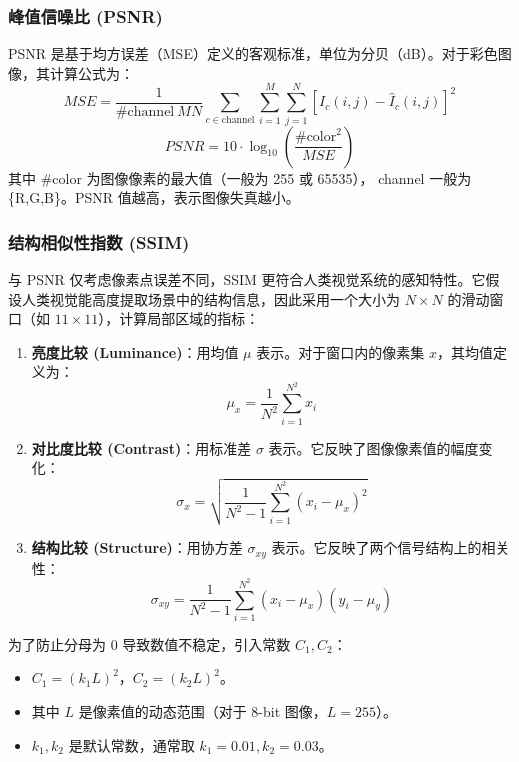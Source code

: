 	\subsubsection{峰值信噪比 (PSNR)}
	PSNR 是基于均方误差（MSE）定义的客观标准，单位为分贝（dB）。对于彩色图像，其计算公式为：
	\begin{equation*}
		MSE = \frac{1}{\text{\#channel} \ M N} \sum_{c \in \text{channel}} \sum_{i=1}^{M} \sum_{j=1}^{N} [I_c(i,j) - \hat{I}_c(i,j)]^2
	\end{equation*}
	\begin{equation*}
		PSNR = 10 \cdot \log_{10} \left( \frac{\text{\#color}^2}{MSE} \right)
	\end{equation*}
	其中 \#color 为图像像素的最大值（一般为 255 或 65535）， channel 一般为 \{R,G,B\}。PSNR 值越高，表示图像失真越小。
	
	\subsubsection{结构相似性指数 (SSIM)}
	与 PSNR 仅考虑像素点误差不同，SSIM 更符合人类视觉系统的感知特性。它假设人类视觉能高度提取场景中的结构信息，因此采用一个大小为 $N \times N$ 的滑动窗口（如 $11 \times 11$），计算局部区域的指标：
	
	\begin{enumerate}
		\item \textbf{亮度比较 (Luminance)}：用均值 $\mu$ 表示。对于窗口内的像素集 $x$，其均值定义为：
		\begin{equation*}
			\mu_x = \frac{1}{N^2} \sum_{i=1}^{N^2} x_i
		\end{equation*}
		
		\item \textbf{对比度比较 (Contrast)}：用标准差 $\sigma$ 表示。它反映了图像像素值的幅度变化：
		\begin{equation*}
			\sigma_x = \sqrt{\frac{1}{N^2-1} \sum_{i=1}^{N^2} (x_i - \mu_x)^2}
		\end{equation*}
		
		\item \textbf{结构比较 (Structure)}：用协方差 $\sigma_{xy}$ 表示。它反映了两个信号结构上的相关性：
		\begin{equation*}
			\sigma_{xy} = \frac{1}{N^2-1} \sum_{i=1}^{N^2} (x_i - \mu_x)(y_i - \mu_y)
		\end{equation*}
	\end{enumerate}
	
	为了防止分母为 0 导致数值不稳定，引入常数 $C_1, C_2$：
	\begin{itemize}
		\item $C_1 = (k_1 L)^2$，$C_2 = (k_2 L)^2$。
		\item 其中 $L$ 是像素值的动态范围（对于 8-bit 图像，$L=255$）。
		\item $k_1, k_2$ 是默认常数，通常取 $k_1=0.01, k_2=0.03$。
	\end{itemize}
	
